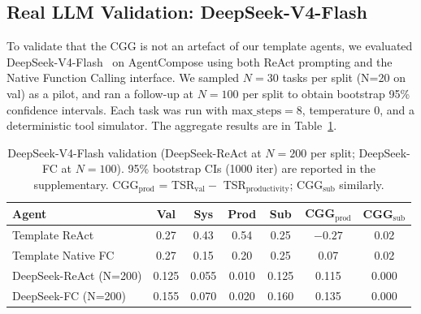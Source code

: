 ﻿\documentclass{article}
\begin{document}
\subsection{Real LLM Validation: DeepSeek-V4-Flash}

To validate that the CGG is not an artefact of our template agents, we evaluated DeepSeek-V4-Flash~\citep{deepseek2024v3} on AgentCompose using both ReAct prompting and the Native Function Calling interface. We sampled $N{=}30$ tasks per split (N=20 on val) as a pilot, and ran a follow-up at $N{=}100$ per split to obtain bootstrap 95\% confidence intervals. Each task was run with $\text{max\_steps}{=}8$, temperature $0$, and a deterministic tool simulator. The aggregate results are in Table~\ref{tab:llm}.

\begin{table}[h]
    \centering
    \small
    \begin{tabular}{lcccccc}
        \toprule
        Agent & Val & Sys & Prod & Sub & CGG$_{\text{prod}}$ & CGG$_{\text{sub}}$ \\
        \midrule
        Template ReAct       & 0.27 & 0.43 & 0.54 & 0.25 & $-0.27$ & 0.02 \\
        Template Native FC   & 0.27 & 0.15 & 0.20 & 0.25 & 0.07 & 0.02 \\
        \midrule
        DeepSeek-ReAct (N=200)      & 0.125 & 0.055 & 0.010 & 0.125 & 0.115 & 0.000 \\
        DeepSeek-FC (N=200)         & 0.155 & 0.070 & 0.020 & 0.160 & 0.135 & 0.000 \\
        \bottomrule
    \end{tabular}
    \caption{DeepSeek-V4-Flash validation (DeepSeek-ReAct at $N{=}200$ per split; DeepSeek-FC at $N{=}100$). 95\% bootstrap CIs (1000 iter) are reported in the supplementary. CGG$_{\text{prod}}$ = TSR$_{\text{val}} -$ TSR$_{\text{productivity}}$; CGG$_{\text{sub}}$ similarly.}
    \label{tab:llm}
\end{table}
\end{document}
